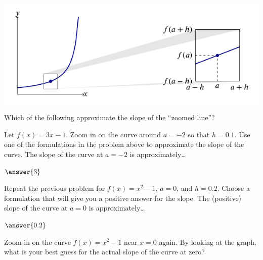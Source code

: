 \documentclass{ximera}
\begin{document}

\begin{image}
  \includegraphics{backupGraph.png}
\end{image}


\begin{problem}
  Which of the following approximate the slope of the ``zoomed line''?
  \begin{selectAll}
  \end{selectAll}
\end{problem}

\begin{problem}
   Let $f(x) = 3x-1$.  Zoom in on the curve around $a = -2$ so that $h
   = 0.1$.  Use one of the formulations in the problem above to
   approximate the slope of the curve.  The slope of the curve at $a =
   -2$ is approximately\dots \begin{prompt}$\answer{3}$\end{prompt}
\end{problem}

\begin{problem}
   Repeat the previous problem for $f(x) = x^2 - 1$, $a = 0$, and $h =
   0.2$.  Choose a formulation that will give you a positive answer
   for the slope.  The (positive) slope of the curve at $a = 0$ is
   approximately\dots\begin{prompt} $\answer{0.2}$\end{prompt}
\end{problem}


\begin{problem}
   Zoom in on the curve $f(x) = x^2 - 1$ near $x=0$ again.  By looking
   at the graph, what is your best guess for the actual slope of the
   curve at zero?
   \begin{multipleChoice}
   \end{multipleChoice}
\end{problem}


\end{document}
